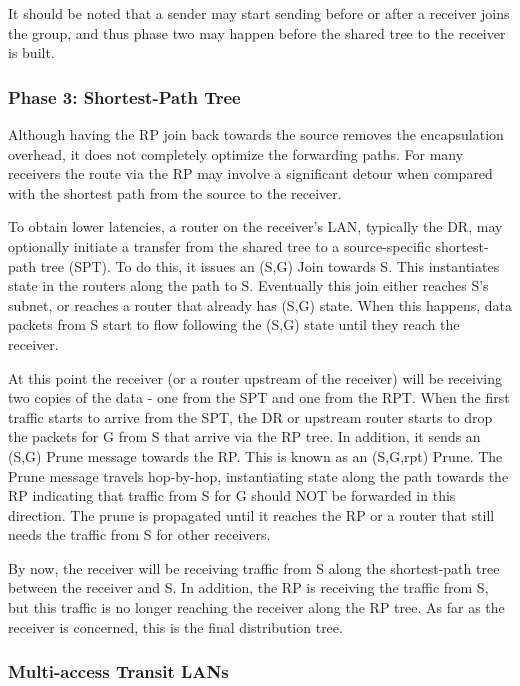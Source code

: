 It should be noted that a sender may start sending before or after a
receiver joins the group, and thus phase two may happen before the
shared tree to the receiver is built.

\subsubsection*{Phase 3: Shortest-Path Tree}

Although having the RP join back towards the source removes the
encapsulation overhead, it does not completely optimize the forwarding
paths.  For many receivers the route via the RP may involve a
significant detour when compared with the shortest path from the
source to the receiver.  

To obtain lower latencies, a router on the receiver's LAN, typically
the DR, may optionally initiate a transfer from the shared tree to a
source-specific shortest-path tree (SPT).  To do this, it issues an
(S,G) Join towards S.  This instantiates state in the routers along
the path to S.  Eventually this join either reaches S's subnet, or
reaches a router that already has (S,G) state.  When this happens,
data packets from S start to flow following the (S,G) state until they
reach the receiver.

At this point the receiver (or a router upstream of the receiver) will
be receiving two copies of the data - one from the SPT and one from
the RPT.  When the first traffic starts to arrive from the SPT, the DR
or upstream router starts to drop the packets for G from S that arrive
via the RP tree.  In addition, it sends an (S,G) Prune message towards
the RP.  This is known as an (S,G,rpt) Prune.  The Prune message
travels hop-by-hop, instantiating state along the path towards the RP
indicating that traffic from S for G should NOT be forwarded in this
direction.  The prune is propagated until it reaches the RP or a
router that still needs the traffic from S for other receivers.

By now, the receiver will be receiving traffic from S along the
shortest-path tree between the receiver and S.  In addition, the RP is
receiving the traffic from S, but this traffic is no longer reaching
the receiver along the RP tree.  As far as the receiver is concerned,
this is the final distribution tree.

\subsubsection{Multi-access Transit LANs}

